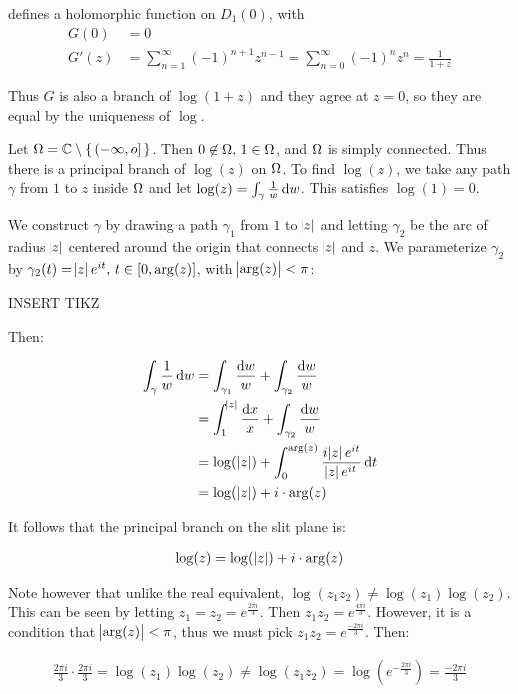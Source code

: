 defines a holomorphic function on $D_1(0)$, with
\begin{align*}
   G(0)&=0\\
   G'(z) &= \sum_{n=1}^\infty (-1)^{n+1} z^{n-1} = \sum_{n=0}^\infty (-1)^n z^n= \frac{1}{1+z}
\end{align*}

Thus $G$ is also a branch of $\log(1+z)$ and they agree at $z=0$, so they are equal by the uniqueness of $\log$.


\begin{example}
Let $\Omega = \mathbb{C} \setminus \set{(-\infty, o ] }$. Then $0 \not\in \Omega, \, 1 \in \Omega$, and $\Omega$ is simply connected. Thus there is a principal branch of $\log(z)$ on $\Omega$. To find $\log(z)$, we take any path $\gamma$ from $1$ to $z$ inside $\Omega$ and let $\log(z) = \int_\gamma \frac{1}{w} \dif w$. This satisfies $\log(1) = 0$.

We construct $\gamma$ by drawing a path $\gamma_1$ from $1$ to $\abs{z}$ and letting $\gamma_2$ be the arc of radius $\abs{z}$ centered around the origin that connects $\abs{z}$ and $z$. We parameterize $\gamma_2$ by $\gamma_2(t) = \abs{z} e^{it}, \, t \in [0,\arg(z)]$, with $\abs{\arg(z)} < \pi$:

INSERT TIKZ

Then:

\begin{align*}
    \int_{\gamma} \frac{1}{w} \dif w &= \int_{\gamma_1} \frac{\dif w}{w}  + \int_{\gamma_2} \frac{\dif w}{w}\\
    &= \int_1^{\abs{z}} \frac{\dif x}{x} + \int_{\gamma_2} \frac{\dif w}{w}\\
    &= \log( \, \abs{z}) + \int_0^{\arg(z)} \frac{i \abs{z} e^{it}}{\abs{z} e^{it}} \dif t\\
    &= \log( \, \abs{z}) + i \cdot {\arg(z)}\\
\end{align*}

It follows that the principal branch on the slit plane is:

\begin{align*}
    \log(z) = \log( \, \abs{z} ) + i \cdot {\arg(z)}
\end{align*}

Note however that unlike the real equivalent, $\log(z_1 z_2) \neq \log(z_1) \log(z_2)$. This can be seen by letting $z_1 = z_2 = e^{\frac{2 \pi i}{3}}$. Then $z_1 z_2 = e^{\frac{4 \pi i}{3}}$. However, it is a condition that $\abs{ \arg (z)} < \pi$, thus we must pick $z_1 z_2 = e^{\frac{-2 \pi i}{3}}$. Then:

\begin{align*}
    \frac{2 \pi i }{3} \cdot \frac{2 \pi i }{3} = \log(z_1) \log ( z_2 ) \neq \log ( z_1 z_2 ) = \log \left( e^{ - \frac{2 \pi i}{3}} \right) = \frac{- 2 \pi i}{3}
\end{align*}
\end{example}


